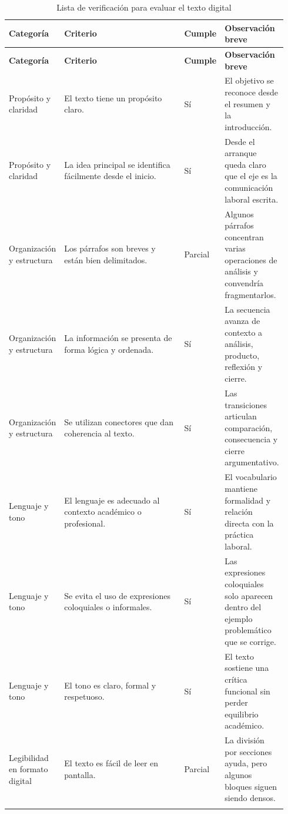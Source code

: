 \begingroup
\small
\setlength{\tabcolsep}{5pt}
\renewcommand{\arraystretch}{1.32}
\begin{longtable}{@{}p{0.18\linewidth}p{0.43\linewidth}p{0.13\linewidth}p{0.20\linewidth}@{}}
\caption{Lista de verificación para evaluar el texto digital}\label{tab:lista-verificacion}\\
\toprule
\textbf{Categoría} & \textbf{Criterio} & \textbf{Cumple} & \textbf{Observación breve} \\
\midrule
\endfirsthead
\toprule
\textbf{Categoría} & \textbf{Criterio} & \textbf{Cumple} & \textbf{Observación breve} \\
\midrule
\endhead
Propósito y claridad & El texto tiene un propósito claro. & Sí & El objetivo se reconoce desde el resumen y la introducción. \\
\addlinespace
Propósito y claridad & La idea principal se identifica fácilmente desde el inicio. & Sí & Desde el arranque queda claro que el eje es la comunicación laboral escrita. \\
\addlinespace
Organización y estructura & Los párrafos son breves y están bien delimitados. & Parcial & Algunos párrafos concentran varias operaciones de análisis y convendría fragmentarlos. \\
\addlinespace
Organización y estructura & La información se presenta de forma lógica y ordenada. & Sí & La secuencia avanza de contexto a análisis, producto, reflexión y cierre. \\
\addlinespace
Organización y estructura & Se utilizan conectores que dan coherencia al texto. & Sí & Las transiciones articulan comparación, consecuencia y cierre argumentativo. \\
\addlinespace
Lenguaje y tono & El lenguaje es adecuado al contexto académico o profesional. & Sí & El vocabulario mantiene formalidad y relación directa con la práctica laboral. \\
\addlinespace
Lenguaje y tono & Se evita el uso de expresiones coloquiales o informales. & Sí & Las expresiones coloquiales solo aparecen dentro del ejemplo problemático que se corrige. \\
\addlinespace
Lenguaje y tono & El tono es claro, formal y respetuoso. & Sí & El texto sostiene una crítica funcional sin perder equilibrio académico. \\
\addlinespace
Legibilidad en formato digital & El texto es fácil de leer en pantalla. & Parcial & La división por secciones ayuda, pero algunos bloques siguen siendo densos. \\
\addlinespace

\end{longtable}
